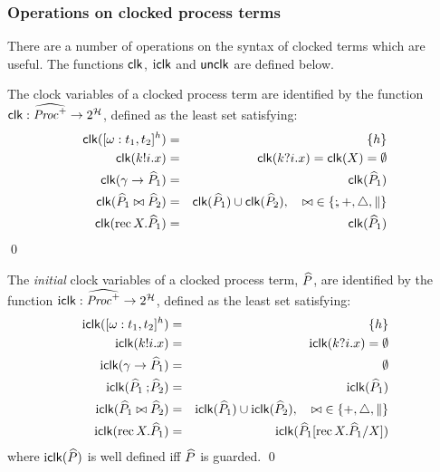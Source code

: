 \subsubsection{Operations on clocked process terms}
There are a number of operations on the syntax of clocked terms which are
useful. The functions ${\mathop{\sf clk}}$, ${\mathop{\mathrm{i}{\sf clk}}}$ and ${\mathop{{\sf unclk}}}$ are defined below.
\begin{definition}
The clock variables of a clocked process term 
are identified by the function $\clk : \CProcO{} \fun 2^\clocks$,
defined as the least set satisfying:
\begin{eqnarray*}
\clk([\op:t_1,t_2]^\clock) & = & \{\clock\} \\
\clk(\kk!\ii.\xx) & = & \clk(\kk?\ii.\xx)  = \clk(X) = \emptyset \\
\clk(\g \guard \PP_1) & = & \clk(\PP_1) \\
\clk(\PP_1 \genop \PP_2) & = & \clk(\PP_1) \cup \clk(\PP_2), \quad \genop\; \in
\{\sq,\choice,\interrupt,\parallel\} \\
\clk(\rec X.\PP_1) & = & \clk(\PP_1)
\end{eqnarray*}
\qed
\end{definition}
\begin{definition}\label{def:tgiclk}
The \emph{initial} clock variables of a clocked process term, ${\widehat{P}}$, 
are identified by the function $\iclk : \CProcO{} \fun 2^\clocks$,
defined as the least set satisfying:
\begin{eqnarray*}
\iclk([\op:t_1,t_2]^\clock) & = & \{\clock\} \\
\iclk(\kk!\ii.\xx) & = & \iclk(\kk?\ii.\xx)  = \emptyset \\
\iclk(\g \guard \PP_1) & = & \emptyset \\
\iclk(\PP_1 \sq \PP_2) & = & \iclk(\PP_1) \\
\iclk(\PP_1 \genop \PP_2) & = & \iclk(\PP_1) \cup \iclk(\PP_2), \quad \genop\; \in
\{\choice,\interrupt,\parallel\} \\
\iclk(\rec X.\PP_1) & = & \iclk(\PP_1[\rec X.\PP_1/X])
\end{eqnarray*}
where ${\mathop{\mathrm{i}{\sf clk}}}({\widehat{P}})$ is well defined iff ${\widehat{P}}$ is guarded.
\qed
\end{definition}

